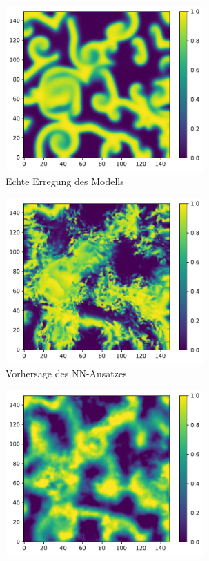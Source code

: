 \begin{figure}[h]
	\centering
	\begin{subfigure}{.5\textwidth}
		\centering
		\includegraphics[height=2.5in]{figures/results/unblur/esn_barkley_u_blur_orig.pdf}
		\setcapmargin[1cm]{1cm}
		\caption{Echte Erregung des Modells}
		\label{fig:exp_unblur_barkley_result_orig}
	\end{subfigure}%
	\begin{subfigure}{.5\textwidth}
		\centering
		\includegraphics[height=2.5in]{figures/results/unblur/nn_barkley_u_blur_pred.pdf}
		\setcapmargin[1cm]{1cm}
  		\caption{Vorhersage des \textsc{NN}-Ansatzes}
  		\label{fig:exp_unblur_barkley_result_nn_pred}
	\end{subfigure}
	\begin{subfigure}{.5\textwidth}
		\centering
		\includegraphics[height=2.5in]{figures/results/unblur/rbf_barkley_u_blur_pred.pdf}

\end{subfigure}
\end{figure}
